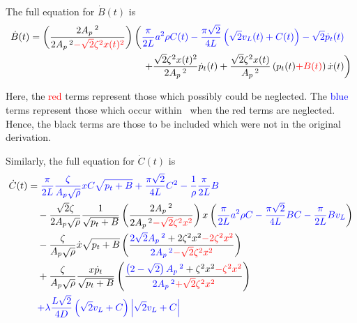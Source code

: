 The full equation for $\dot{B}(t)$ is
~
\begin{equation*}
\begin{split}
    \dot{B}(t) = \left( \frac{2 A_p\,^2}{2 A_p\,^2 \textcolor{Red}{- \sqrt{2} \zeta^2 x(t)^2}} \right)
    &\left( \textcolor{Blue}{
    \frac{\pi}{2L} a^2 \rho C(t) - \frac{\pi \sqrt{2}}{4L} \left( \sqrt{2} v_L(t) + C(t) \right) - \sqrt{2} \dot{p}_t(t)}
     \right.  \\ & \quad \left.  %
    + \frac{\sqrt{2} \zeta^2 x(t)^2}{2 A_p\,^2} \dot{p}_t(t) + \frac{\sqrt{2} \zeta^2 x(t)}{A_p\,^2} \left( p_t(t) \textcolor{Red}{+ B(t)} \right) \dot{x}(t)
    \right)
\end{split}
\end{equation*}

Here, the \textcolor{Red}{red} terms represent those which possibly could be neglected. The \textcolor{Blue}{blue} terms represent those which occur within~\cite{Hos2015ModelPipe} when the red terms are neglected. Hence, the black terms are those to be included which were not in the original derivation.

Similarly, the full equation for $\dot{C}(t)$ is
~
\begin{equation*}
\begin{split}
    \dot{C}(t) &=
    \textcolor{Blue}{
    \frac{\pi}{2L} \frac{\zeta}{A_p \sqrt{\rho}} x C \sqrt{p_t + B}
    + \frac{\pi \sqrt{2}}{4 L} C^2
    - \frac{1}{\rho} \frac{\pi}{2L} B
    } \\ & \quad %
    - \frac{\sqrt{2} \zeta}{2 A_p \sqrt{\rho}} \frac{1}{\sqrt{p_t+B}} \left( \frac{2 A_p\,^2}{2 A_p\,^2 \textcolor{Red}{- \sqrt{2} \zeta^2 x^2}} \right) x \left(
    \textcolor{Blue}{
    \frac{\pi}{2L} a^2 \rho C
    - \frac{\pi \sqrt{2}}{4 L} B C
    - \frac{\pi}{2L} B v_L }
    \right)
    \\ & \quad %
    - \frac{\zeta}{A_p \sqrt{\rho}} \dot{x} \sqrt{p_t + B} \left( \frac{
    \textcolor{Blue}{2 \sqrt{2} A_p\,^2}
    + 2 \zeta^2 x^2 \textcolor{Red}{- 2 \zeta^2 x^2}}{
    \textcolor{Blue}{2 A_p\,^2}
    \textcolor{Red}{- \sqrt{2} \zeta^2 x^2}} \right)
    \\ & \quad %
    + \frac{\zeta}{A_p \sqrt{\rho}} \frac{x \dot{p}_t}{\sqrt{p_t+B}} \left( \frac{
    \textcolor{Blue}{\left( 2 - \sqrt{2} \right) A_p\,^2}
    + \zeta^2 x^2 \textcolor{Red}{- \zeta^2 x^2}}{
    \textcolor{Blue}{2 A_p\,^2}
    \textcolor{Red}{+ \sqrt{2} \zeta^2 x^2}} \right)
    \\ & \quad %
    \textcolor{Blue}{
    + \lambda \frac{L \sqrt{2}}{4 D} \left( \sqrt{2} v_L + C \right) \left| \sqrt{2} v_L + C \right| }
\end{split}
\end{equation*}

